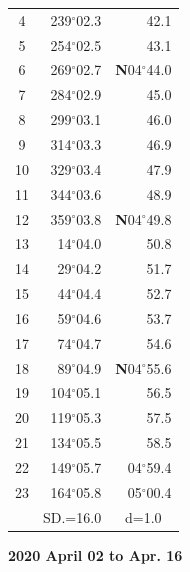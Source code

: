\documentclass[10pt, a4paper]{report}
\begin{document}
\begin{scriptsize}
\begin{tabular*}{0.2\textwidth}[t]{@{\extracolsep{\fill}}|c|rr|}
4 & 239$^\circ$02.3 & 42.1\\
5 & 254$^\circ$02.5 & 43.1\\[2Pt]
6 & 269$^\circ$02.7 & \textbf{N}04$^\circ$44.0\\
7 & 284$^\circ$02.9 & 45.0\\
8 & 299$^\circ$03.1 & 46.0\\
9 & 314$^\circ$03.3 & \raisebox{0.24ex}{\boldmath$\cdot$~\boldmath$\cdot$~~}46.9\\
10 & 329$^\circ$03.4 & 47.9\\
11 & 344$^\circ$03.6 & 48.9\\[2Pt]
12 & 359$^\circ$03.8 & \textbf{N}04$^\circ$49.8\\
13 & 14$^\circ$04.0 & 50.8\\
14 & 29$^\circ$04.2 & 51.7\\
15 & 44$^\circ$04.4 & \raisebox{0.24ex}{\boldmath$\cdot$~\boldmath$\cdot$~~}52.7\\
16 & 59$^\circ$04.6 & 53.7\\
17 & 74$^\circ$04.7 & 54.6\\[2Pt]
18 & 89$^\circ$04.9 & \textbf{N}04$^\circ$55.6\\
19 & 104$^\circ$05.1 & 56.5\\
20 & 119$^\circ$05.3 & 57.5\\
21 & 134$^\circ$05.5 & \raisebox{0.24ex}{\boldmath$\cdot$~\boldmath$\cdot$~~}58.5\\
22 & 149$^\circ$05.7 & 04$^\circ$59.4\\
23 & 164$^\circ$05.8 & 05$^\circ$00.4\\
\hline
\rule{0pt}{2.4ex} & \multicolumn{1}{c}{SD.=16.0} & \multicolumn{1}{c|}{d=1.0}\\
\hline
\end{tabular*}

\end{scriptsize}
\newpage
\sffamily
\noindent
\begin{flushright}
\textbf{2020 April 02 to Apr. 16}\par
\end{flushright}
\end{document}
